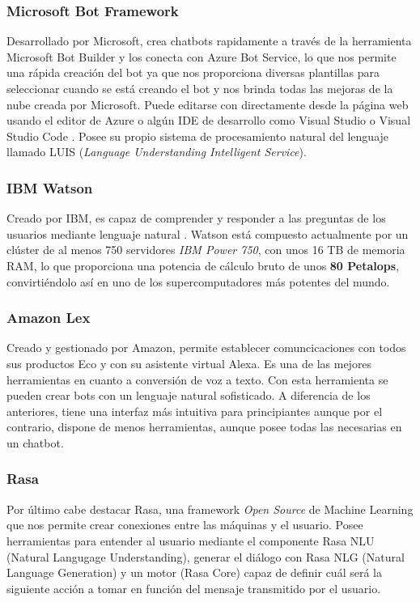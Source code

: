 \subsubsection{Microsoft Bot Framework}
Desarrollado por Microsoft, crea chatbots rapidamente a través de la herramienta Microsoft Bot Builder y los conecta con Azure Bot Service, lo que nos permite una rápida creación del bot ya que nos proporciona diversas plantillas para seleccionar cuando se está creando el bot y nos brinda todas las mejoras de la nube creada por Microsoft. Puede editarse con directamente desde la página web usando el editor de Azure o algún IDE de desarrollo como Visual Studio o Visual Studio Code \cite{MicrosoftBotBuilder}. Posee su propio sistema de procesamiento natural del lenguaje llamado LUIS (\textit{Language Understanding Intelligent Service}).  




\subsubsection{IBM Watson}
Creado por IBM, es capaz de comprender y responder a las preguntas de los usuarios mediante lenguaje natural \cite{ibmWatson}. Watson está compuesto actualmente por un clúster de al menos 750 servidores \textit{IBM Power 750}, con unos 16 TB de memoria RAM, lo que proporciona una potencia de cálculo bruto de unos \textbf{80 Petalops}, convirtiéndolo así en uno de los supercomputadores más potentes del mundo. 

\subsubsection{Amazon Lex}
Creado y gestionado por Amazon, permite establecer comuncicaciones con todos sus productos Eco y con su asistente virtual Alexa. Es una de las mejores herramientas en cuanto a conversión de voz a texto. Con esta herramienta se pueden crear bots con un lenguaje natural sofisticado. A diferencia de los anteriores, tiene una interfaz más intuitiva para principiantes aunque por el contrario, dispone de menos herramientas, aunque posee todas las necesarias en un chatbot.

\subsubsection{Rasa}
Por último cabe destacar Rasa, una framework \textit{Open Source} de Machine Learning que nos permite crear conexiones entre las máquinas y el usuario. Posee herramientas para entender al usuario mediante el componente Rasa NLU (Natural Langugage Understanding), generar el diálogo con Rasa NLG (Natural Language Generation) y un motor (Rasa Core) capaz de definir cuál será la siguiente acción a tomar en función del mensaje transmitido por el usuario.   


